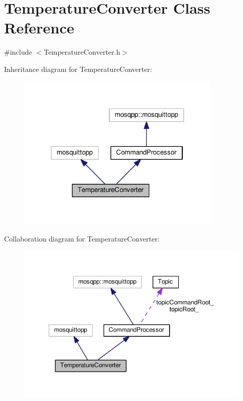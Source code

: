 \hypertarget{class_temperature_converter}{}\section{Temperature\+Converter Class Reference}
\label{class_temperature_converter}


{\ttfamily \#include $<$Temperature\+Converter.\+h$>$}



Inheritance diagram for Temperature\+Converter\+:
\nopagebreak
\begin{figure}[H]
\begin{center}
\leavevmode
\includegraphics[width=276pt]{class_temperature_converter__inherit__graph}
\end{center}
\end{figure}


Collaboration diagram for Temperature\+Converter\+:
\nopagebreak
\begin{figure}[H]
\begin{center}
\leavevmode
\includegraphics[width=346pt]{class_temperature_converter__coll__graph}
\end{center}
\end{figure}
